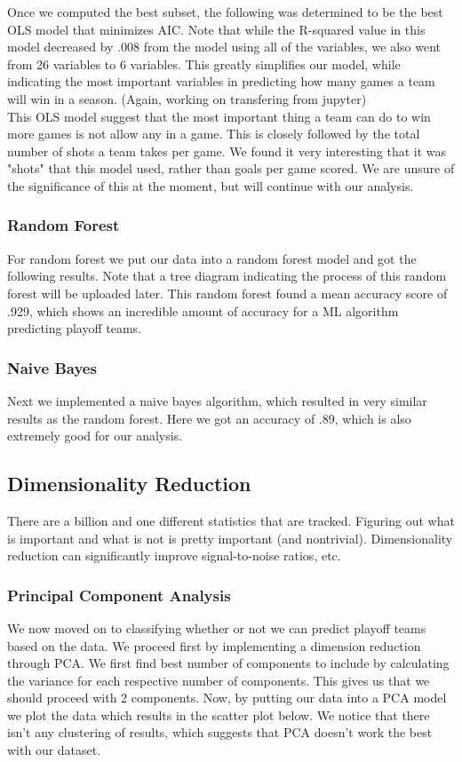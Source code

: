 \documentclass{notes}
\begin{document}
      Once we computed the best subset, the following was determined to be the best OLS model that minimizes AIC.
      Note that while the R-squared value in this model decreased by .008 from the model using all of the variables, we also went from 26 variables to 6 variables.
      This greatly simplifies our model, while indicating the most important variables in predicting how many games a team will win in a season.
      (Again, working on transfering from jupyter)\\

      This OLS model suggest that the most important thing a team can do to win more games is not allow any in a game.
      This is closely followed by the total number of shots a team takes per game.
      We found it very interesting that it was "shots" that this model used, rather than goals per game scored.
      We are unsure of the significance of this at the moment, but will continue with our analysis.

      \subsubsection{Random Forest}
        For random forest we put our data into a random forest model and got the following results.
        Note that a tree diagram indicating the process of this random forest will be uploaded later.
        This random forest found a mean accuracy score of .929, which shows an incredible amount of accuracy for a ML algorithm predicting playoff teams.

      \subsubsection{Naive Bayes}
      Next we implemented a naive bayes algorithm, which resulted in very similar results as the random forest.
      Here we got an accuracy of .89, which is also extremely good for our analysis.


    \subsection{Dimensionality Reduction}
      There are a billion and one different statistics that are tracked.
      Figuring out what is important and what is not is pretty important (and nontrivial).
      Dimensionality reduction can significantly improve signal-to-noise ratios, etc.

      \subsubsection{Principal Component Analysis}
        We now moved on to classifying whether or not we can predict playoff teams based on the data.
        We proceed first by implementing a dimension reduction through PCA.
        We first find best number of components to include by calculating the variance for each respective number of components.
        This gives us that we should proceed with 2 components.
        Now, by putting our data into a PCA model we plot the data which results in the scatter plot below.
        We notice that there isn't any clustering of results, which suggests that PCA doesn't work the best with our dataset.
\end{document}
